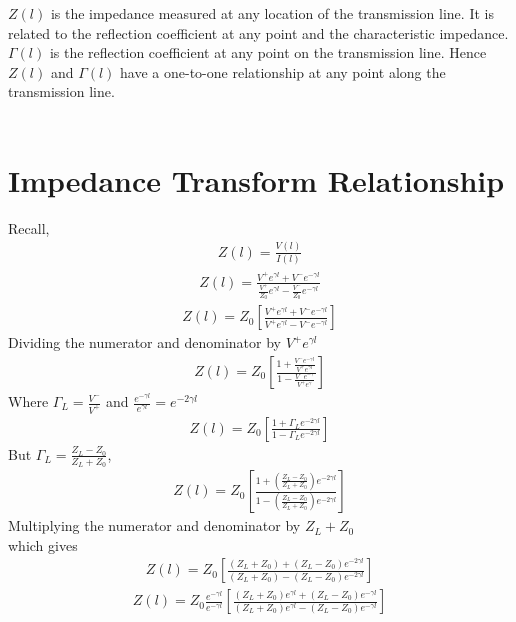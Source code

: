 $Z(l)$ is the impedance measured at any location of the transmission line. It is related to the reflection coefficient at any point and the characteristic impedance.
$\Gamma(l)$ is the reflection coefficient at any point on the transmission line.
Hence $Z(l)$ and $\Gamma(l)$ have a one-to-one relationship at any point along the transmission line.\\\\
\section{Impedance Transform Relationship}
Recall,
\begin{align*}
Z(l) = \frac{V(l)}{I(l)}
\end{align*}
\begin{align*}
Z(l) = \frac{V^+e^{\gamma l} + V^-e^{-\gamma l}}{\frac{V^+}{Z_0}e^{\gamma l} - \frac{V^-}{Z_0}e^{-\gamma l}}
\end{align*}
\begin{align*}
Z(l) = Z_0[\frac{V^+e^{\gamma l} + V^-e^{-\gamma l}}{V^+e^{\gamma l} - V^-e^{-\gamma l}}]
\end{align*}
Dividing  the numerator and denominator by $V^+e^{\gamma l}$ 
\begin{align*}
Z(l) = Z_0[\frac{1 + \frac{V^-e^{-\gamma l}}{V^+e^{\gamma l}}}{1 - \frac{V^-e^{-\gamma }}{V^+e^{\gamma }}}]
\end{align*}
Where $\Gamma_L = \frac{V^-}{V^+}$ and $\frac{e^{-\gamma l}}{e^{\gamma l}} = e^{-2\gamma l}$
\begin{align}
Z(l)=  Z_0\left[\frac{1 + \Gamma_L e^{-2\gamma l}}{1 - \Gamma_L e^{-2\gamma l}}\right]
\end{align}
But $\Gamma_L
= \frac{Z_L - Z_0}{Z_L + Z_0}$,
\begin{align*}
Z(l) = Z_0 \left[\frac{1 + (\frac{Z_L - Z_0}{Z_L + Z_0})e^{-2\gamma l}}{1 - (\frac{Z_L - Z_0}{Z_L + Z_0})e^{-2\gamma l}}\right]
\end{align*}
Multiplying the numerator and denominator by $Z_L + Z_0 $\\
which gives
\begin{align*}
Z(l) = Z_0 \left[\frac{(Z_L + Z_0) + (Z_L - Z_0)e^{-2\gamma l}}{(Z_L + Z_0) - (Z_L - Z_0)e^{-2\gamma l}}\right]
\end{align*}
\begin{align*}
Z(l) = Z_0 \frac{e^{-\gamma l}}{e^{-\gamma l}}\left[\frac{(Z_L + Z_0)e^{\gamma l} + (Z_L - Z_0)e^{-\gamma l}}{(Z_L + Z_0)e^{\gamma l} - (Z_L - Z_0)e^{-\gamma l}}\right]
\end{align*}
